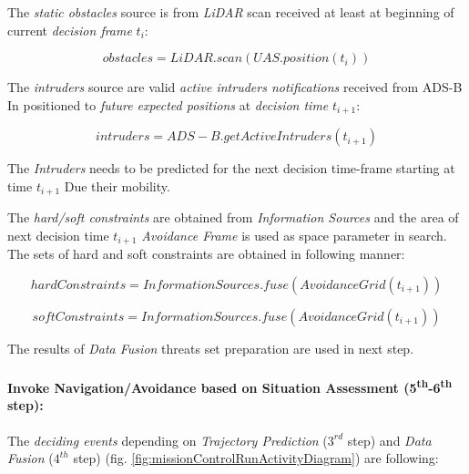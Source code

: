 The \emph{static obstacles} source is from \emph{LiDAR} scan received at least at beginning of current \emph{decision frame} $t_i$:

\begin{equation*}
        obstacles=LiDAR.scan(UAS.position(t_i))
\end{equation*}

The \emph{intruders} source are valid \emph{active intruders notifications} received from ADS-B In positioned to \emph{future expected positions} at \emph{decision time} $t_{i+1}$:

\begin{equation*}
        intruders=ADS-B.get Active Intruders(t_{i+1})
\end{equation*}

\begin{note}
    The \emph{Intruders} needs to be predicted for the next decision time-frame starting at time $t_{i+1}$ Due their mobility.
\end{note}

\noindent The \emph{hard/soft constraints} are obtained from \emph{Information Sources} and the area of next decision time $t_{i+1}$ \emph{Avoidance Frame} is used as space parameter in search. The sets of hard and soft constraints are obtained in following manner:

\begin{equation*}
    hard Constraints= Information Sources.fuse(Avoidance Grid(t_{i+1}))
\end{equation*}

\begin{equation*}        
        soft Constraints=Information Sources.fuse(Avoidance Grid(t_{i+1}))
\end{equation*}

\noindent The results of \emph{Data Fusion} threats set preparation are used in next step.


\paragraph{Invoke Navigation/Avoidance based on Situation Assessment (5\textsuperscript{th}-6\textsuperscript{th} step):} The \emph{deciding events} depending on \emph{Trajectory Prediction} ($3^{rd}$ step) and \emph{Data Fusion} ($4^{th}$ step) (fig. \ref{fig:missionControlRunActivityDiagram}) are following:

